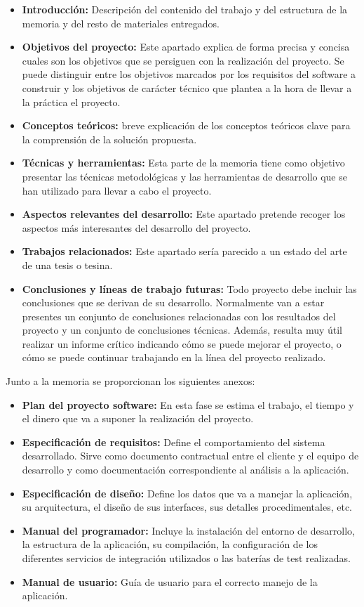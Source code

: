 \begin{itemize}
\tightlist
\item
  \textbf{Introducción:} Descripción del contenido del trabajo y del estructura de la memoria y del resto de materiales entregados.
\item
  \textbf{Objetivos del proyecto:} Este apartado explica de forma precisa y concisa cuales son los objetivos que se persiguen con la realización del proyecto. Se puede distinguir entre los objetivos marcados por los requisitos del software a construir y los objetivos de carácter técnico que plantea a la hora de llevar a la práctica el proyecto.
\item
  \textbf{Conceptos teóricos:} breve explicación de los conceptos
  teóricos clave para la comprensión de la solución propuesta.
\item
  \textbf{Técnicas y herramientas:} Esta parte de la memoria tiene como objetivo presentar las técnicas metodológicas y las herramientas de desarrollo que se han utilizado para llevar a cabo el proyecto.
\item
  \textbf{Aspectos relevantes del desarrollo:} Este apartado pretende recoger los aspectos más interesantes del desarrollo del proyecto.
\item
  \textbf{Trabajos relacionados:} Este apartado sería parecido a un estado del arte de una tesis o tesina.
\item
  \textbf{Conclusiones y líneas de trabajo futuras:} Todo proyecto debe incluir las conclusiones que se derivan de su desarrollo. Normalmente van a estar presentes un conjunto de conclusiones relacionadas con los resultados del proyecto y un conjunto de conclusiones técnicas. 
Además, resulta muy útil realizar un informe crítico indicando cómo se puede mejorar el proyecto, o cómo se puede continuar trabajando en la línea del proyecto realizado.
\end{itemize}

Junto a la memoria se proporcionan los siguientes anexos:

\begin{itemize}
\tightlist
\item
  \textbf{Plan del proyecto software:} En esta fase se estima el trabajo, el tiempo y el dinero que va a suponer la realización del proyecto.
\item
  \textbf{Especificación de requisitos:} Define el comportamiento del sistema desarrollado. Sirve
como documento contractual entre el cliente y el equipo de desarrollo y
como documentación correspondiente al análisis a la aplicación.
\item
  \textbf{Especificación de diseño:} Define los datos que va a
manejar la aplicación, su arquitectura, el diseño de sus interfaces, sus
detalles procedimentales, etc.
\item
  \textbf{Manual del programador:} Incluye la instalación del entorno de desarrollo, la estructura de la
aplicación, su compilación, la configuración de los diferentes servicios
de integración utilizados o las baterías de test realizadas.
\item
  \textbf{Manual de usuario:} Guía de usuario para el correcto manejo de
  la aplicación.
\end{itemize}